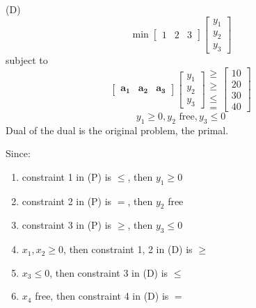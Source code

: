 \begin{exbox}
\begin{example}
        (D)
        \[ \min \begin{bmatrix}
                1 & 2 & 3
            \end{bmatrix}
            \begin{bmatrix}
                y_1 \\
                y_2 \\
                y_3
            \end{bmatrix}\]
        subject to
        \[
            \begin{bmatrix}
                \bm{a_1} & \bm{a_2} & \bm{a_3}
            \end{bmatrix}
            \begin{bmatrix}
                y_1 \\
                y_2 \\
                y_3
            \end{bmatrix}
            \begin{matrix}
                \geqslant \\
                \geqslant \\
                \le       \\
                =
            \end{matrix}
            \begin{bmatrix}
                10 \\
                20 \\
                30 \\
                40
            \end{bmatrix}\]
        \[ y_1\geqslant  0, y_2 \text{ free}, y_3\leqslant 0 \]
        Dual of the dual is the original problem, the primal.

        Since:
        \begin{enumerate}
            \item constraint 1 in (P) is $\leqslant$, then $y_1 \geqslant  0$
            \item constraint 2 in (P) is $=$, then $y_2$ free
            \item constraint 3 in (P) is $\geqslant $, then $y_3 \leqslant 0$
            \item $x_1,x_2\geqslant  0$, then constraint 1, 2 in (D) is $\geqslant $
            \item $x_3\leqslant 0$, then constraint 3 in (D) is $\le$
            \item $x_4$ free, then constraint 4 in (D) is $=$
        \end{enumerate}
    \end{example}
\end{exbox}

